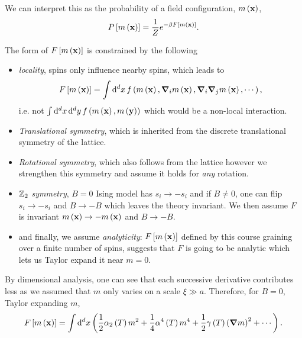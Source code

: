 
We can interpret this as the probability of a field configuration, $m \left( \vb{x} \right) $,
\begin{align}
    P \left[ m \left( \vb{x} \right)  \right] = \frac{1}{Z} e^{-\beta F \left[ m \left( \vb{x} \right)  \right] }
.\end{align}

The form of $F \left[ m \left( \vb{x} \right)  \right] $ is constrained by the following
\begin{itemize}
    \item \textit{locality}, spins only influence nearby spins, which leads to
        \begin{align}
            F \left[ m \left( \vb{x} \right)  \right] = \int \dd{^{d}x} f \left( m \left( \vb{x} \right) , \grad_i m \left( \vb{x} \right) , \grad_i \grad_j m \left( \vb{x} \right) , \cdots \right) 
        ,\end{align}
        i.e. not $\int \dd{^{d}x} \dd{^{d}y} f \left( m \left( \vb{x} \right) , m \left( \vb{y} \right)  \right) $ which would be a non-local interaction.
    \item \textit{Translational symmetry}, which is inherited from the discrete translational symmetry of the lattice.
    \item \textit{Rotational symmetry}, which also follows from the lattice however we strengthen this symmetry and assume it holds for \textit{any} rotation.
    \item $\mathbb{Z}_2$ \textit{symmetry}, $B = 0$ Ising model has $s_{i} \to - s_{i}$ and if $B \neq 0$, one can flip $s_{i} \to -s_{i}$ and $B \to - B$ which leaves the theory invariant. We then assume $F$ is invariant $m \left( \vb{x} \right) \to - m \left( \vb{x} \right) $ and $B \to - B$.
    \item and finally, we assume \textit{analyticity}: $F \left[ m \left( \vb{x} \right)  \right] $ defined by this course graining over a finite number of spins, suggests that $F$ is going to be analytic which lets us Taylor expand it near $m = 0$.
\end{itemize}

By dimensional analysis, one can see that each successive derivative contributes less as we assumed that $m$ only varies on a scale $\xi \gg a$. Therefore, for $B = 0$, Taylor expanding $m$,
\begin{align}
    F \left[ m\left( \vb{x} \right)  \right]  = \int \dd{^{d}x} \left( \frac{1}{2} \alpha_2 \left( T \right) m^2 + \frac{1}{4} \alpha^{4}\left( T \right) m^{4} + \frac{1}{2} \gamma \left( T \right) \left( \grad m \right)^2 + \cdots  \right) 
.\end{align}

